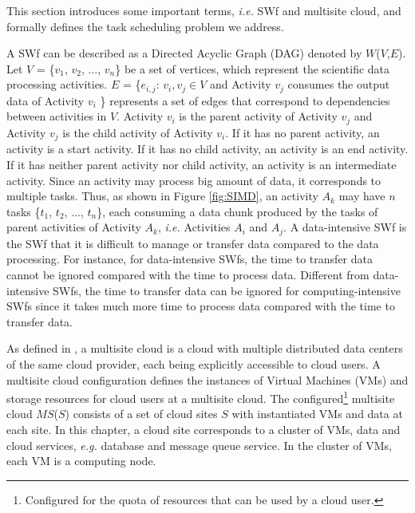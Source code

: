 This section introduces some important terms, \textit{i.e.} SWf and multisite cloud, and formally defines the task scheduling problem we address.

A SWf can be described as a Directed Acyclic Graph (DAG) denoted by $W$($V$,$E$).
Let $V$ = \{$v_1$, $v_2$, ..., $v_n$\} be a set of vertices, which represent the scientific data processing activities. $E$ = \{$e_{i,j}$: $v_i, v_j \in V$ and Activity $v_j$ consumes the output data of Activity $v_i$ \} represents a set of edges that correspond to dependencies between activities in $V$. Activity $v_i$ is the parent activity of Activity $v_j$ and Activity $v_j$ is the child activity of Activity $v_i$.
If it has no parent activity, an activity is a start activity. If it has no child activity, an activity is an end activity. If it has neither parent activity nor child activity, an activity is an intermediate activity. Since an activity may process big amount of data, it corresponds to multiple tasks. Thus, as shown in Figure \ref{fig:SIMD}, an activity $A_k$ may have $n$ tasks \{$t_1$, $t_2$, ..., $t_n$\}, each consuming a data chunk produced by the tasks of parent activities of Activity $A_k$, \textit{i.e.} Activities $A_i$ and $A_j$. A data-intensive SWf is the SWf that it is difficult to manage or transfer data compared to the data processing. For instance, for data-intensive SWfs, the time to transfer data cannot be ignored compared with the time to process data. Different from data-intensive SWfs, the time to transfer data can be ignored for computing-intensive SWfs since it takes much more time to process data compared with the time to transfer data. 


As defined in \cite{Liu2014a}, a multisite cloud is a cloud with multiple distributed data centers of the same cloud provider, each being explicitly accessible to cloud users. A multisite cloud configuration defines the instances of Virtual Machines (VMs) and storage resources for cloud users at a multisite cloud. 
The configured\footnote{Configured for the quota of resources that can be used by a cloud user.} multisite cloud $MS$($S$) consists of a set of cloud sites $S$ with instantiated VMs and data at each site. In this chapter, a cloud site corresponds to a cluster of VMs, data and cloud services, \textit{e.g.} database and message queue service. In the cluster of VMs, each VM is a computing node. 

